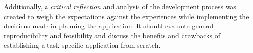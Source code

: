 Additionally, a \emph{critical reflection} and analysis of the development process was created to weigh the expectations against the experiences while implementing the decisions made in planning the application.
It should evaluate general reproducibility and feasibility and discuss the benefits and drawbacks of establishing a task-specific application from scratch.
